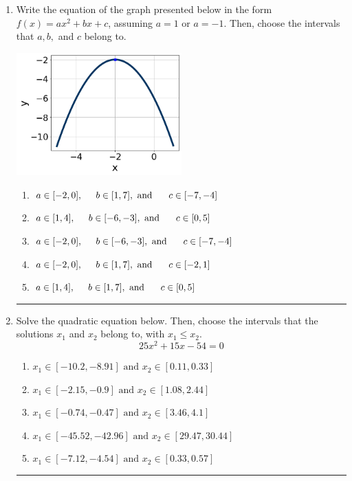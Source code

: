 \documentclass[14pt]{extbook}
\newcommand{\litem}[1]{\item#1\hspace*{-1cm}\rule{\textwidth}{0.4pt}}
\begin{document}
\begin{enumerate}
{\begin{enumerate}[label=\Alph*.]
\end{enumerate} }
\litem{
Write the equation of the graph presented below in the form $f(x)=ax^2+bx+c$, assuming  $a=1$ or $a=-1$. Then, choose the intervals that $a, b,$ and $c$ belong to.
\begin{center}
    \includegraphics[width=0.5\textwidth]{../Figures/quadraticGraphToEquationCopyB.png}
\end{center}
\begin{enumerate}[label=\Alph*.]
\item \( a \in [-2, 0], \hspace*{5mm} b \in [1, 7], \text{ and } \hspace*{5mm} c \in [-7, -4] \)
\item \( a \in [1, 4], \hspace*{5mm} b \in [-6, -3], \text{ and } \hspace*{5mm} c \in [0, 5] \)
\item \( a \in [-2, 0], \hspace*{5mm} b \in [-6, -3], \text{ and } \hspace*{5mm} c \in [-7, -4] \)
\item \( a \in [-2, 0], \hspace*{5mm} b \in [1, 7], \text{ and } \hspace*{5mm} c \in [-2, 1] \)
\item \( a \in [1, 4], \hspace*{5mm} b \in [1, 7], \text{ and } \hspace*{5mm} c \in [0, 5] \)

\end{enumerate} }
\litem{
Solve the quadratic equation below. Then, choose the intervals that the solutions $x_1$ and $x_2$ belong to, with $x_1 \leq x_2$.\[ 25x^{2} +15 x -54 = 0 \]\begin{enumerate}[label=\Alph*.]
\item \( x_1 \in [-10.2, -8.91] \text{ and } x_2 \in [0.11, 0.33] \)
\item \( x_1 \in [-2.15, -0.9] \text{ and } x_2 \in [1.08, 2.44] \)
\item \( x_1 \in [-0.74, -0.47] \text{ and } x_2 \in [3.46, 4.1] \)
\item \( x_1 \in [-45.52, -42.96] \text{ and } x_2 \in [29.47, 30.44] \)
\item \( x_1 \in [-7.12, -4.54] \text{ and } x_2 \in [0.33, 0.57] \)

\end{enumerate} }
\end{enumerate}
\end{document}
